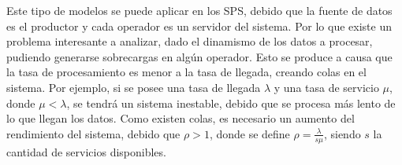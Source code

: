 
Este tipo de modelos se puede aplicar en los SPS, debido que la fuente de datos es el productor y cada operador es un servidor del sistema. Por lo que existe un problema interesante a analizar, dado el dinamismo de los datos a procesar, pudiendo generarse sobrecargas en algún operador. Esto se produce a causa que la tasa de procesamiento es menor a la tasa de llegada, creando colas en el sistema. Por ejemplo, si se posee una tasa de llegada $\lambda$ y una tasa de servicio $\mu$, donde $\mu < \lambda$, se tendrá un sistema inestable, debido que se procesa más lento de lo que llegan los datos. Como existen colas, es necesario un aumento del rendimiento del sistema, debido que $\rho > 1 $, donde se define $\rho = \frac{\lambda}{s\mu}$, siendo $s$ la cantidad de servicios disponibles.